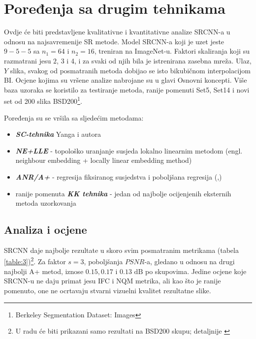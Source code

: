 \documentclass[12pt]{report}
\numberwithin{equation}{section}
\begin{document}
  \section{Poređenja sa drugim tehnikama}
  
  Ovdje će biti predstavljene kvalitativne i kvantitativne analize SRCNN-a u odnosu na najsavremenije SR metode. Model SRCNN-a koji je uzet jeste $9-5-5$ sa $n_1=64$ i $n_2=16$, treniran na ImageNet-u. Faktori skaliranja koji su razmatrani jesu $2$, $3$ i 4, i za svaki od njih bila je istrenirana zasebna mreža. Ulaz, $Y$ slika, svakog od posmatranih metoda dobijao se isto bikubičnom interpolacijom BI. Ocjene kojima su vršene analize nabrojane su u glavi Osnovni koncepti. Više baza uzoraka se koristilo za testiranje metoda, ranije pomenuti Set5, Set14 i novi set od 200 slika BSD200\footnote{Berkeley Segmentation Dataset: Images}.  
  
  Poređenja su se vršila sa sljedećim metodama: 

  
 \begin{itemize}
  
 \item \textbf{\textit{SC-tehnika}} Yanga i autora \cite{sparse1}
 \item \textbf{\textit{NE+LLE}} - topološko uranjanje susjeda lokalno linearnim metodom (engl. neighbour embedding + locally linear embedding method) \cite{nelle}
 \item \textbf{\textit{ANR/A+}} - regresija fiksiranog susjedstva i poboljšana regresija  (\cite{anr},\cite{aplus})
 \item ranije pomenuta \textit{\textbf{KK tehnika}} - jedan od najbolje ocijenjenih eksternih metoda uzorkovanja\cite{kernel} 
  
\end{itemize}   

   \subsection{Analiza i ocjene}
   
 SRCNN daje najbolje rezultate u skoro svim posmatranim metrikama (tabela \ref{table:3})\footnote{U radu će biti prikazani samo rezultati na BSD200 skupu; detaljnije \cite{main}}. Za faktor $s=3$, poboljšanja $PSNR$-a, gledano u odnosu na drugi najbolji A+ metod, iznose $0.15, 0.17$ i $0.13\text{ dB}$ po skupovima. Jedine ocjene koje SRCNN-u ne daju primat jesu  IFC i NQM metrika, ali kao što je ranije pomenuto, one ne ocrtavaju stvarni vizuelni kvalitet rezultatne slike. 
 
\end{document}
